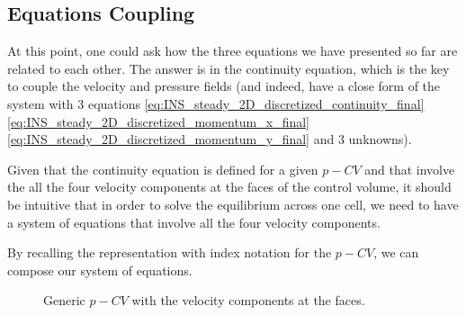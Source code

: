 \subsection{Equations Coupling}
\label{subsec:equations_coupling}

At this point, one could ask how the three equations we have presented so far are related to each other.
The answer is in the continuity equation, which is the key to couple the velocity and pressure fields (and indeed, have a close form of the system with 3 equations \ref{eq:INS_steady_2D_discretized_continuity_final} \ref{eq:INS_steady_2D_discretized_momentum_x_final} \ref{eq:INS_steady_2D_discretized_momentum_y_final} and 3 unknowns).

Given that the continuity equation is defined for a given $p-CV$ and that involve the all the four velocity components at the faces of the control volume, it should be intuitive that in order to solve the equilibrium across one cell, we need to have a system of equations that involve all the four velocity components.

By recalling the representation with index notation for the $p-CV$, we can compose our system of equations.

\begin{figure}[H]
    \centering
    \def\nCV{1}
    \def\dX{5cm}
    \def\dY{5cm}

    \caption{Generic $p-CV$ with the velocity components at the faces.}
\end{figure}

